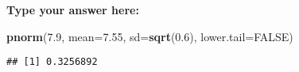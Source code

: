 \documentclass[
]{article}
\newenvironment{Shaded}{\begin{snugshade}}{\end{snugshade}}
\newcommand{\DataTypeTok}[1]{\textcolor[rgb]{0.13,0.29,0.53}{#1}}
\newcommand{\FloatTok}[1]{\textcolor[rgb]{0.00,0.00,0.81}{#1}}
\newcommand{\KeywordTok}[1]{\textcolor[rgb]{0.13,0.29,0.53}{\textbf{#1}}}
\newcommand{\NormalTok}[1]{#1}
\newcommand{\OperatorTok}[1]{\textcolor[rgb]{0.81,0.36,0.00}{\textbf{#1}}}
\newcommand{\OtherTok}[1]{\textcolor[rgb]{0.56,0.35,0.01}{#1}}
\newcommand{\StringTok}[1]{\textcolor[rgb]{0.31,0.60,0.02}{#1}}
\begin{document}
\textbf{Type your answer here:}

\begin{Shaded}
\begin{Highlighting}[]
\KeywordTok{pnorm}\NormalTok{(}\FloatTok{7.9}\NormalTok{, }\DataTypeTok{mean=}\FloatTok{7.55}\NormalTok{, }\DataTypeTok{sd=}\KeywordTok{sqrt}\NormalTok{(}\FloatTok{0.6}\NormalTok{), }\DataTypeTok{lower.tail=}\OtherTok{FALSE}\NormalTok{)}
\end{Highlighting}
\end{Shaded}

\begin{verbatim}
## [1] 0.3256892
\end{verbatim}

\begin{Shaded}
\end{Shaded}
\end{document}
